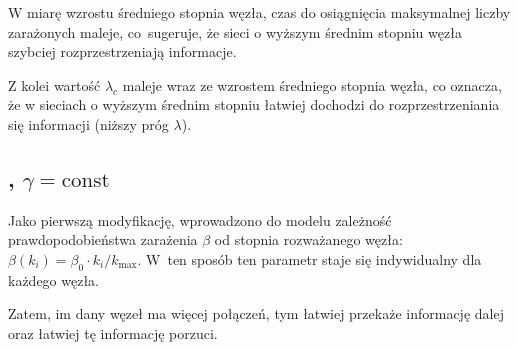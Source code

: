 \documentclass[13pt,a4paper]{article}
\newcommand{\const}{\text{const}}
\begin{document}
W miarę wzrostu średniego stopnia węzła, czas do osiągnięcia maksymalnej liczby zarażonych maleje, co sugeruje, że sieci o wyższym średnim stopniu węzła szybciej rozprzestrzeniają informacje.

Z kolei wartość $\lambda_c$ maleje wraz ze wzrostem średniego stopnia węzła, co oznacza, że w sieciach o wyższym średnim stopniu łatwiej dochodzi do rozprzestrzeniania się informacji (niższy próg $\lambda$).


\subsection{\texorpdfstring{}{beta proportional to k}, $\gamma=\const$}

Jako pierwszą modyfikację, wprowadzono do modelu zależność prawdopodobieństwa zarażenia $\beta$ od stopnia rozważanego węzła: $\beta(k_i)=\beta_0 \cdot k_i / k_{\max}$. W ten sposób ten parametr staje się indywidualny dla każdego węzła.

Zatem, im dany węzeł ma więcej połączeń, tym łatwiej przekaże informację dalej oraz łatwiej tę informację porzuci.
\end{document}
